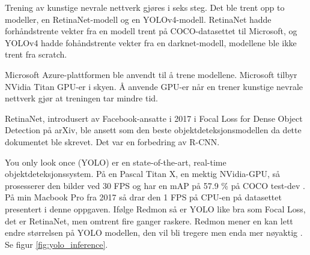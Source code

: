 


Trening av kunstige nevrale nettverk gjøres i seks steg. Det ble trent opp to modeller, en RetinaNet-modell og en YOLOv4-modell. RetinaNet hadde forhåndstrente vekter fra en modell trent på COCO-datasettet til Microsoft, og YOLOv4 hadde fohåndstrente vekter fra en darknet-modell, modellene ble ikke trent fra scratch. \cite{Lin m.fl. 2015 s. 1} %

Microsoft Azure-plattformen ble anvendt til å trene modellene. Microsoft tilbyr NVidia Titan GPU-er i skyen. Å anvende GPU-er når en trener kunstige nevrale nettverk gjør at treningen tar mindre tid. \cite{Dean m.fl. 2012 s. 1}

RetinaNet, introdusert av Facebook-ansatte i 2017 i Focal Loss for Dense Object Detection på arXiv, ble ansett som den beste objektdeteksjonsmodellen da dette dokumentet ble skrevet. Det var en forbedring av R-CNN. \cite{Lin m.fl. 2017}

You only look once (YOLO) er en state-of-the-art, real-time objektdeteksjonssystem. På en Pascal Titan X, en mektig NVidia-GPU, så prosesserer den bilder ved 30 FPS og har en mAP på 57.9 \% på COCO test-dev \cite{Redmon 2018}. På min Macbook Pro fra 2017 så drar den 1 FPS på CPU-en på datasettet presentert i denne oppgaven. Ifølge Redmon så er YOLO like bra som Focal Loss, det er RetinaNet, men omtrent fire ganger raskere. Redmon mener en kan lett endre størrelsen på YOLO modellen, den vil bli tregere men enda mer nøyaktig \cite{Redmon 2016}. Se figur \ref{fig:yolo_inference}. %

